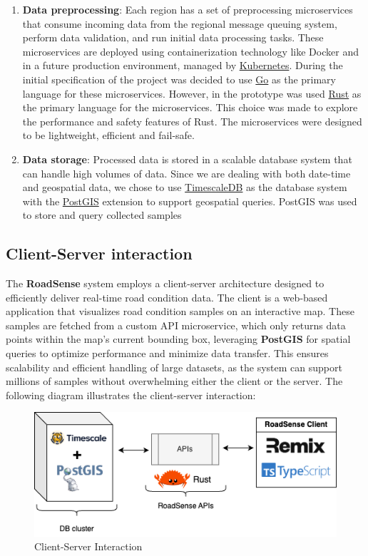 \begin{enumerate}
	\item \textbf{Data preprocessing}: Each region has a set of preprocessing microservices that consume incoming data from the regional message queuing system, perform data validation, and run initial data processing tasks. These microservices are deployed using containerization technology like Docker and in a future production environment, managed by \href{https://kubernetes.io/}{Kubernetes}.
	      During the initial specification of the project was decided to use \href{https://golang.org/}{Go} as the primary language for these microservices. However, in the prototype was used \href{https://rust-lang.org/}{Rust} as the primary language for the microservices. This choice was made to explore the performance and safety features of Rust. The microservices were designed to be lightweight, efficient and fail-safe.

	\item \textbf{Data storage}: Processed data is stored in a scalable database system that can handle high volumes of data. Since we are dealing with both date-time and geospatial data, we chose to use \href{https://www.timescale.com/}{TimescaleDB} as the database system with the \href{https://postgis.net/}{PostGIS} extension to support geospatial queries.
	      PostGIS was used to store and query collected samples
\end{enumerate}

\subsection{Client-Server interaction}

The \textbf{RoadSense} system employs a client-server architecture designed to efficiently deliver real-time road condition data. The client is a web-based application that visualizes road condition samples on an interactive map. These samples are fetched from a custom API microservice, which only returns data points within the map's current bounding box, leveraging \textbf{PostGIS} for spatial queries to optimize performance and minimize data transfer. This ensures scalability and efficient handling of large datasets, as the system can support millions of samples without overwhelming either the client or the server. The following diagram illustrates the client-server interaction:

\begin{figure}[H]
	\centering
	\includegraphics[width=\textwidth]{../../assets/diagrams/client_server_architecture/client_server_arch.png}
	\caption{Client-Server Interaction}
\end{figure}

